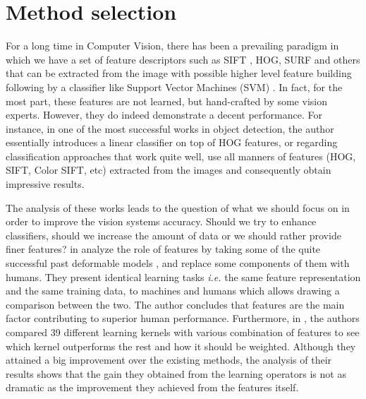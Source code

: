

\section{Method selection}

For a long time in Computer Vision, there has been a prevailing paradigm in which we have a set of feature descriptors such as SIFT \cite{lowe1999object}, HOG\cite{dalal2005histograms}, SURF\cite{bay2006surf} and others that can be extracted from the image with possible higher level feature building following  by a classifier like Support Vector Machines (SVM) \cite{vapnik1964note, boser1992training}. In fact, for the most part, these features are not learned, but hand-crafted by some vision experts. However, they do indeed demonstrate a decent performance. For instance, in one of the most successful works in object detection\cite{felzenszwalb2010object}, the author essentially introduces a linear classifier on top of HOG features, or regarding classification approaches that work quite well, \citeauthor{yu2010object} use all manners of features (HOG, SIFT, Color SIFT, etc) extracted from the images and consequently obtain impressive results. 

\indent The analysis of these works leads to the question of what we should focus on in order to improve the vision systems accuracy. Should we try to enhance classifiers, should we increase the amount of data or we should rather provide finer features? \citeauthor*{parikh2010role} in \cite{parikh2010role} analyze the role of features by taking some of the quite successful past deformable models\cite{albrecht2015deformable} , and replace some components of them with humans. They present identical learning tasks \textit{i.e.} the same feature representation and the same training data, to machines and humans which allows drawing a comparison between the two. The author concludes that features are the main factor contributing to superior human performance. Furthermore, in \cite{gehler2009feature}, the authors compared 39 different learning kernels with various combination of features to see which kernel outperforms the rest and how it should be weighted. Although they attained a big improvement over the existing methods, the analysis of their results shows that the gain they obtained from the learning operators is not as dramatic as the improvement they achieved from the features itself. 

